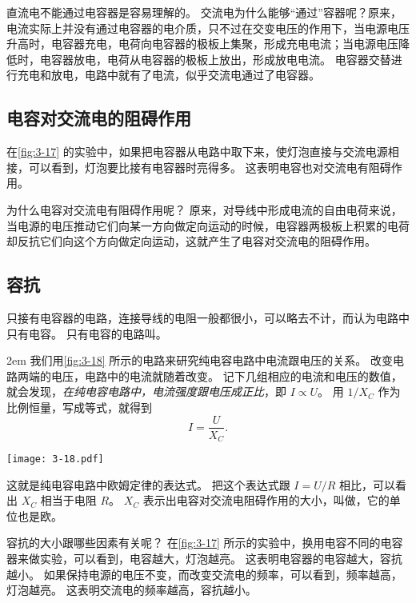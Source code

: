 \medskip
直流电不能通过电容器是容易理解的。
交流电为什么能够“通过”容器呢？原来，电流实际上并没有通过电容器的电介质，只不过在交变电压的作用下，当电源电压升高时，电容器充电，电荷向电容器的极板上集聚，形成充电电流；当电源电压降低时，电容器放电，电荷从电容器的极板上放出，形成放电电流。
电容器交替进行充电和放电，电路中就有了电流，似乎交流电通过了电容器。

\subsection{电容对交流电的阻碍作用}
在\cref{fig:3-17} 的实验中，如果把电容器从电路中取下来，使灯泡直接与交流电源相接，可以看到，灯泡要比接有电容器时亮得多。
这表明电容也对交流电有阻碍作用。

为什么电容对交流电有阻碍作用呢？
原来，对导线中形成电流的自由电荷来说，当电源的电压推动它们向某一方向做定向运动的时候，电容器两极板上积累的电荷却反抗它们向这个方向做定向运动，这就产生了电容对交流电的阻碍作用。

\subsection{容抗}
只接有电容器的电路，连接导线的电阻一般都很小，可以略去不计，而认为电路中只有电容。
只有电容的电路叫。

\medskip\noindent
\begin{minipage}{0.7\linewidth}\parindent2em
我们用\cref{fig:3-18} 所示的电路来研究纯电容电路中电流跟电压的关系。
改变电路两端的电压，电路中的电流就随着改变。
记下几组相应的电流和电压的数值，就会发现，\emph{在纯电容电路中，电流强度跟电压成正比}，即 $I\propto U$。
用 $1/X_C$ 作为比例恒量，写成等式，就得到
\[I=\frac{U}{X_C}.\]
\end{minipage}\hfill
\begin{minipage}{0.25\linewidth}\centering
  \begin{figurehere}
    \texttt{[image: 3-18.pdf]}
    \caption{}\label{fig:3-18}
  \end{figurehere}
\end{minipage}

\medskip\noindent
这就是纯电容电路中欧姆定律的表达式。
把这个表达式跟 $I=U/R$ 相比，可以看出 $X_C$ 相当于电阻 $R$。
$X_C$ 表示出电容对交流电阻碍作用的大小，叫做，它的单位也是欧。

容抗的大小跟哪些因素有关呢？
在\cref{fig:3-17} 所示的实验中，换用电容不同的电容器来做实验，可以看到，电容越大，灯泡越亮。
这表明电容器的电容越大，容抗越小。
如果保持电源的电压不变，而改变交流电的频率，可以看到，频率越高，灯泡越亮。
这表明交流电的频率越高，容抗越小。

